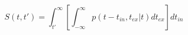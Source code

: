 \begin{equation}
S(t,t') = \int_{t'}^{\infty} \left[ \int_{-\infty}^\infty p(t-t_{in},t_{ex}|t) dt_{ex}\right] dt_{in}
\end{equation}